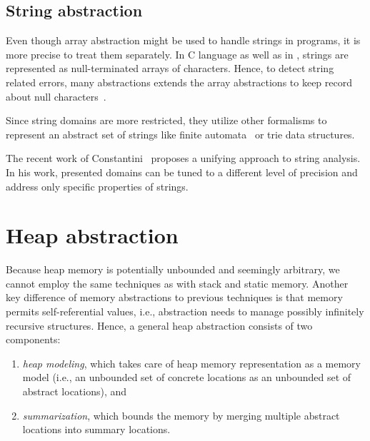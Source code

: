 \subsection{String abstraction}

Even though array abstraction might be used to handle strings in programs, it
is more precise to treat them separately. In C language as well as in \llvm,
strings are represented as null-terminated arrays of characters. Hence, to
detect string related errors, many abstractions extends the array abstractions
to keep record about null characters~\cite{Olliaro2018}.

Since string domains are more restricted, they utilize other formalisms to
represent an abstract set of strings like finite
automata~\cite{Christensen2003} or trie data structures.

The recent work of Constantini~\cite{Costantini2011, Costantini2015} proposes a
unifying approach to string analysis.  In his work, presented domains can be
tuned to a different level of precision and address only specific properties of
strings.


\section{Heap abstraction}

Because heap memory is potentially unbounded and seemingly arbitrary, we cannot
employ the same techniques as with stack and static memory. Another key
difference of memory abstractions to previous techniques is that memory permits
self-referential values, i.e., abstraction needs to manage possibly infinitely
recursive structures. Hence, a general heap abstraction consists of two
components:

\begin{enumerate}
    \item \emph{heap modeling}, which takes care of heap memory representation
        as a memory model (i.e., an unbounded set of concrete locations as an
        unbounded set of abstract locations), and
    \item \emph{summarization}, which bounds the memory by merging multiple
        abstract locations into summary locations.
\end{enumerate}

